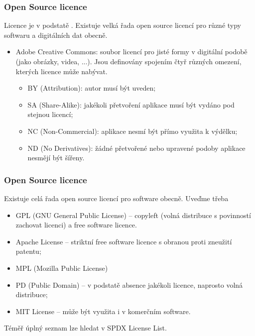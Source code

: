 \documentclass[aspectratio=169,11pt,svgnames,handout]{beamer}
\begin{document}
\begin{frame}
\frametitle{Open Source licence}
Licence je v podstatě . Existuje velká řada open source
licencí pro různé typy softwaru a digitálních dat obecně.
\pause
\begin{itemize}[label=\textbullet]
  \item \alert{Adobe Creative Commons}: soubor licencí pro jisté formy
     v digitální podobě (jako obrázky, videa, ...). Jsou definovány
    spojením čtyř různých omezení, kterých licence může nabývat.
    \pause
    \begin{itemize}[label=$\circ$]
      \item \alert{BY} (Attribution): autor musí být uveden;
        \pause
      \item \alert{SA} (Share-Alike): jakékoli přetvoření aplikace musí být
        vydáno pod stejnou licencí;
        \pause
      \item \alert{NC} (Non-Commercial): aplikace nesmí být přímo využita k
        výdělku;
        \pause
      \item \alert{ND} (No Derivatives): žádné přetvořené nebo upravené podoby
        aplikace nesmějí být šířeny.
    \end{itemize}
\end{itemize}
\end{frame}

\begin{frame}
\frametitle{Open Source licence}
Existuje celá řada open source licencí pro software obecně. Uveďme třeba
\begin{itemize}[label=\textbullet]
  \item \alert{GPL} (GNU General Public License) -- \alert{copyleft} (volná
    distribuce s povinností zachovat licenci) a \alert{free software} licence.
    \pause
  \item \alert{Apache License} -- striktní \alert{free software} licence s
    obranou proti zneužití \alert{patentu};
    \pause
  \item \alert{MPL} (Mozilla Public License)
    \pause
  \item \alert{PD} (Public Domain) -- v podstatě absence jakékoli licence,
    naprosto volná distribuce;
    \pause
  \item \alert{MIT License} -- může být využita i v komerčním software.
\end{itemize}
\pause
Téměř úplný seznam lze hledat v \alert{SPDX License List}.
\end{frame}
\end{document}
